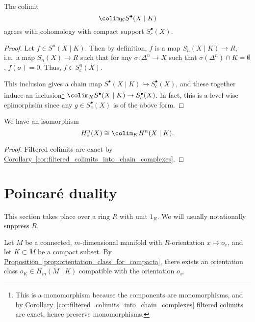 \documentclass[main.tex]{subfiles}
\begin{document}
\begin{proposition}
  The colimit
  \begin{equation*}
    \colim_{K} S^{\bullet}(X \mid K)
  \end{equation*}
  agrees with cohomology with compact support \(S^{\bullet}_{c}(X)\).
\end{proposition}
\begin{proof}
  Let \(f \in S^{n}(X \mid K)\). Then by definition, \(f\) is a map \(S_{n}(X \mid K) \to R\), i.e.\ a map \(S_{n}(X) \to R\) such that for any \(\sigma\colon \Delta^{n} \to X\) such that \(\sigma(\Delta^{n}) \cap K = \emptyset\), \(f(\sigma) = 0\). Thus, \(f \in S^{n}_{c}(X)\).

  This inclusion gives a chain map \(S^{\bullet}(X \mid K) \hookrightarrow S^{\bullet}_{c}(X)\), and these together induce an inclusion\footnote{This is a monomorphism because the components are monomorphisms, and by \hyperref[cor:filtered_colimits_into_chain_complexes]{Corollary~\ref*{cor:filtered_colimits_into_chain_complexes}} filtered colimits are exact, hence preserve monomorphisms.} \(\colim_{K} S^{\bullet}(X \mid K) \to S^{\bullet}_{c}(X)\). In fact, this is a level-wise epimorphsim since any \(g \in S^{\bullet}_{c}(X)\) is of the above form.
\end{proof}

\begin{corollary}
  We have an isomorphism
  \begin{equation*}
    H^{n}_{c}(X) \cong \colim_{K} H^{n}(X \mid K).
  \end{equation*}
\end{corollary}
\begin{proof}
  Filtered colimits are exact by \hyperref[cor:filtered_colimits_into_chain_complexes]{Corollary~\ref*{cor:filtered_colimits_into_chain_complexes}}.
\end{proof}

\section{Poincaré duality}
\label{sec:poincare_duality}

This section takes place over a ring \(R\) with unit \(1_{R}\). We will usually notationally suppress \(R\).

Let \(M\) be a connected, \(m\)-dimensional manifold with \(R\)-orientation \(x \mapsto o_{x}\), and let \(K \subset M\) be a compact subset. By \hyperref[prop:orientation_class_for_compacta]{Proposition~\ref*{prop:orientation_class_for_compacta}}, there exists an orientation class \(o_{K} \in H_{m}(M \mid K)\) compatible with the orientation \(o_{x}\).
\end{document}
